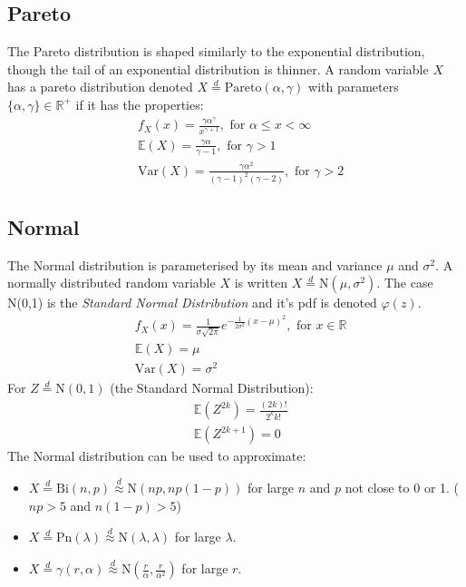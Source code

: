 \documentclass[titlepage,twocolumn]{article}
\begin{document}
\subsection*{Pareto}
The Pareto distribution is shaped similarly to the exponential distribution, though the tail of an exponential distribution is thinner. A random variable $X$ has a pareto distribution denoted $X\stackrel{d}{=}\mbox{Pareto}(\alpha, \gamma)$ with parameters $\{\alpha,\gamma \} \in \mathbb{R}^+$ if it has the properties:
\begin{align*}
    &f_X(x)=\frac{\gamma \alpha^\gamma}{x^{\gamma+1}}, \mbox{ for } \alpha \leq x < \infty\\
    &\mathbb{E}(X)=\frac{\gamma \alpha}{\gamma - 1}, \mbox{ for } \gamma > 1\\
    &\mbox{Var}(X)=\frac{\gamma \alpha^2}{(\gamma-1)^2(\gamma - 2)}, \mbox{ for } \gamma > 2
\end{align*}
\vfill
\subsection*{Normal}
The Normal distribution is parameterised by its mean and variance $\mu$ and $\sigma^2$. A normally distributed random variable $X$ is written $X\stackrel{d}{=}\mbox{N}(\mu, \sigma^2)$. The case N(0,1) is the \textit{Standard Normal Distribution} and it's pdf is denoted $\varphi(z)$.
\begin{align*}
    &f_X(x)=\frac{1}{\sigma \sqrt{2\pi}}e^{-\frac{1}{2\sigma^2}(x-\mu)^2}, \mbox{ for } x \in \mathbb{R}\\
    &\mathbb{E}(X)=\mu\\
    &\mbox{Var}(X)=\sigma^2
\end{align*}
For $Z \stackrel{d}{=}\mbox{N}(0,1)$ (the Standard Normal Distribution):
\begin{align*}
    &\mathbb{E}(Z^{2k})=\frac{(2k)!}{2^k k!}\\
    &\mathbb{E}(Z^{2k+1})=0
\end{align*}
The Normal distribution can be used to approximate:
\begin{itemize}
    \item $X \stackrel{d}{=}\mbox{Bi}(n,p) \stackrel{d}{\approx}\mbox{N}(np,np(1-p))$ for large $n$ and $p$ not close to 0 or 1. ($np > 5$ and $n(1-p) > 5$)
    \item $X \stackrel{d}{=}\mbox{Pn}(\lambda) \stackrel{d}{\approx}\mbox{N}(\lambda, \lambda)$ for large $\lambda$.
    \item $X \stackrel{d}{=} \gamma(r,\alpha) \stackrel{d}{\approx}\mbox{N}(\frac{r}{\alpha}, \frac{r}{\alpha^2})$ for large $r$.
\end{itemize}
\end{document}
